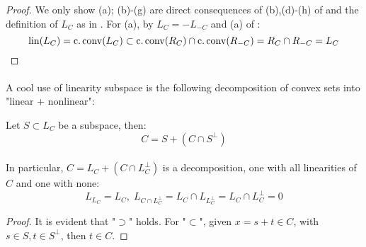\begin{proof}
	We only show (a); (b)-(g) are direct consequences of (b),(d)-(h) of  and the definition of $L_C$ as in . For (a), by $L_C=-L_{-C}$ and (a) of :
	\[
		\operatorname{lin}(L_C)=\operatorname{c.conv}(L_C)\subset\operatorname{c.conv}(R_C)\cap \operatorname{c.conv}(R_{-C})=R_C\cap R_{-C}=L_C\qedhere{}
	\]
\end{proof}

\paragraph{}A cool use of linearity subspace is the following decomposition of convex sets into "linear + nonlinear":

\begin{prop}
	\label{prop:013-decomposition}
	Let $S\subset L_C$ be a subspace, then:
	\[C=S+(C\cap S^{\perp})\]
\end{prop}

\paragraph{}In particular, $C=L_C+(C\cap L_C^\perp)$ is a decomposition, one with all linearities of $C$ and one with none:
\[
	L_{L_C}=L_C,\; L_{C\cap L_C^\perp}=L_C\cap L_{L_C^\perp}=L_C\cap L_C^\perp=0
\]

\begin{proof}
	It is evident that "$\supset$" holds. For "$\subset$", given $x=s+t\in C$, with $s\in S,t\in S^\perp$, then $t\in C$.
\end{proof}

